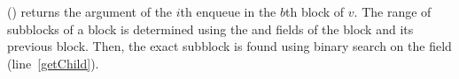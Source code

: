 () returns the argument of the
$i$th enqueue in the $b$th block of  $v$. 
The range of subblocks of a block is determined using the  and
 fields of the block and its previous block. Then,
the exact subblock is found using binary search on the 
field (line~\ref{getChild}). 



